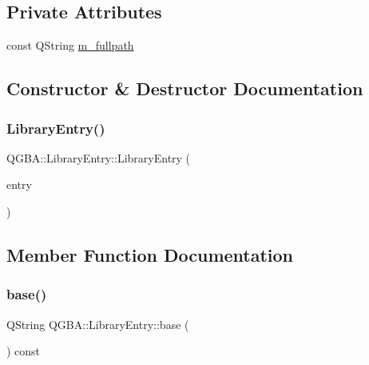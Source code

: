 \subsection*{Private Attributes}
\begin{DoxyCompactItemize}
\item 
const Q\+String \mbox{\hyperlink{class_q_g_b_a_1_1_library_entry_adcae5157db6b4db8e03fd461f1cc871a}{m\+\_\+fullpath}}
\end{DoxyCompactItemize}


\subsection{Constructor \& Destructor Documentation}
\mbox{\label{class_q_g_b_a_1_1_library_entry_afa644e0ef9fffbf3f75cff29f36e35ec}} 
\subsubsection{\texorpdfstring{Library\+Entry()}{LibraryEntry()}}
{\footnotesize\ttfamily Q\+G\+B\+A\+::\+Library\+Entry\+::\+Library\+Entry (\begin{DoxyParamCaption}\item[{m\+Library\+Entry $\ast$}]{entry }\end{DoxyParamCaption})}



\subsection{Member Function Documentation}
\mbox{\label{class_q_g_b_a_1_1_library_entry_ac3c1d30d77d4c861562a91d69bcc540b}} 
\subsubsection{\texorpdfstring{base()}{base()}}
{\footnotesize\ttfamily Q\+String Q\+G\+B\+A\+::\+Library\+Entry\+::base (\begin{DoxyParamCaption}{ }\end{DoxyParamCaption}) const\hspace{0.3cm}{\ttfamily [inline]}}

